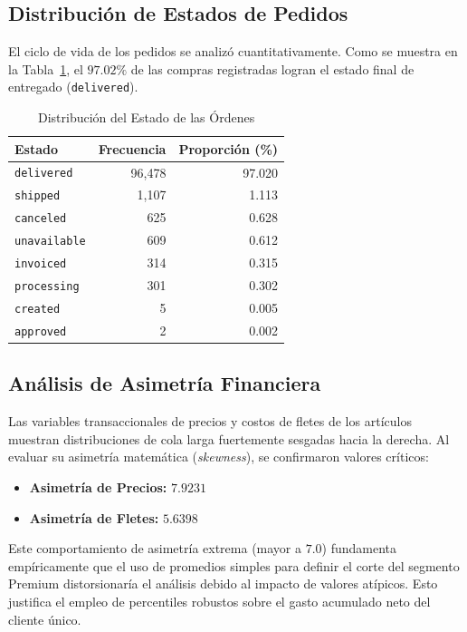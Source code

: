 \documentclass[journal,letterpaper]{IEEEtran}
\begin{document}
\subsection{Distribución de Estados de Pedidos}
El ciclo de vida de los pedidos se analizó cuantitativamente. Como se muestra en la Tabla~\ref{tab:status}, el $97.02\%$ de las compras registradas logran el estado final de entregado (\texttt{delivered}).

\begin{table}[h]
\centering
\caption{Distribución del Estado de las Órdenes}
\label{tab:status}
\begin{tabular}{lrr}
\toprule
Estado & Frecuencia & Proporción (\%) \\
\midrule
\texttt{delivered} & 96,478 & 97.020 \\
\texttt{shipped} & 1,107 & 1.113 \\
\texttt{canceled} & 625 & 0.628 \\
\texttt{unavailable} & 609 & 0.612 \\
\texttt{invoiced} & 314 & 0.315 \\
\texttt{processing} & 301 & 0.302 \\
\texttt{created} & 5 & 0.005 \\
\texttt{approved} & 2 & 0.002 \\
\bottomrule
\end{tabular}
\end{table}

\subsection{Análisis de Asimetría Financiera}
Las variables transaccionales de precios y costos de fletes de los artículos muestran distribuciones de cola larga fuertemente sesgadas hacia la derecha. Al evaluar su asimetría matemática (\textit{skewness}), se confirmaron valores críticos:
\begin{itemize}
    \item \textbf{Asimetría de Precios:} $7.9231$
    \item \textbf{Asimetría de Fletes:} $5.6398$
\end{itemize}
Este comportamiento de asimetría extrema (mayor a $7.0$) fundamenta empíricamente que el uso de promedios simples para definir el corte del segmento Premium distorsionaría el análisis debido al impacto de valores atípicos. Esto justifica el empleo de percentiles robustos sobre el gasto acumulado neto del cliente único.
\end{document}
